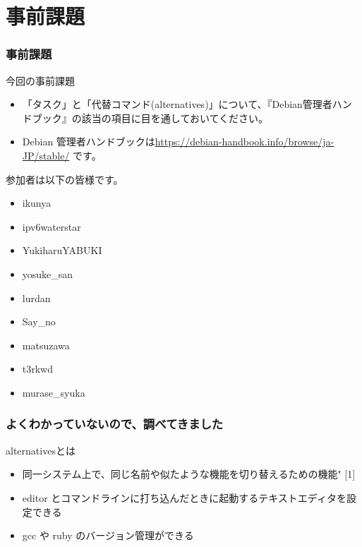 \documentclass[cjk,dvipdfmx,12pt,compress,%
hyperref={bookmarks=true,bookmarksnumbered=true,bookmarksopen=false,%
colorlinks=false,%
pdftitle={第 120 回 関西 Debian 勉強会},%
pdfauthor={倉敷・のがた・佐々木・かわだ・おおつき},%
pdfsubject={資料},%
}]{beamer}
\begin{document}

\section{事前課題}

\begin{frame}[fragile]
  \frametitle{事前課題}
  \begin{block}{今回の事前課題}
   \begin{itemize}
     \item 「タスク」と「代替コマンド(alternatives)」について、『Debian管理者ハンドブック』の該当の項目に目を通しておいてください。
     \item Debian 管理者ハンドブックは\href{https://debian-handbook.info/browse/ja-JP/stable/}{https://debian-handbook.info/browse/ja-JP/stable/} です。
   \end{itemize}
  \end{block}
\end{frame}

\begin{frame}[fragile]
参加者は以下の皆様です。
\begin{itemize}
  \item ikunya
  \item ipv6waterstar
  \item YukiharuYABUKI
  \item yosuke\_san
  \item lurdan
  \item Say\_no
  \item matsuzawa
  \item t3rkwd
  \item murase\_syuka 
\end{itemize}
\end{frame}

\begin{frame}[fragile]
  \frametitle{よくわかっていないので、調べてきました}
  \begin{block}{alternativesとは}
   \begin{itemize}
     \item 同一システム上で、同じ名前や似たような機能を切り替えるための機能" [1] 
     \item editor とコマンドラインに打ち込んだときに起動するテキストエディタを設定できる 
     \item gcc や ruby のバージョン管理ができる
   \end{itemize}
  \end{block}
\end{frame}
\end{document}
